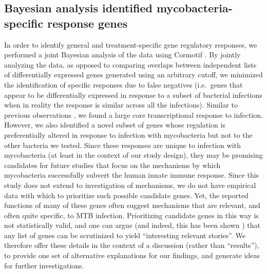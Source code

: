 \subsection{Bayesian analysis identified mycobacteria-specific
response
genes}\label{bayesian-analysis-identified-mycobacteria-specific-response-genes}

In order to identify general and treatment-specific gene regulatory
responses, we performed a joint Bayesian analysis of the data using
Cormotif \citep{Wei2015}. By jointly analyzing the data, as opposed to
comparing overlaps between independent lists of differentially
expressed genes generated using an arbitrary cutoff, we minimized the
identification of specific responses due to false negatives
(i.e.~genes that appear to be differentially expressed in response to
a subset of bacterial infections when in reality the response is
similar across all the infections). Similar to previous observations
\citep{Huang2001, Boldrick2002}, we found a large core transcriptional
response to infection. However, we also identified a novel subset of
genes whose regulation is preferentially altered in response to
infection with mycobacteria but not to the other bacteria we
tested. Since these responses are unique to infection with
mycobacteria (at least in the context of our study design), they may
be promising candidates for future studies that focus on the
mechanisms by which mycobacteria successfully subvert the human innate
immune response. Since this study does not extend to investigation of
mechanisms, we do not have empirical data with which to prioritize
such possible candidate genes. Yet, the reported functions of many of
these genes often suggest mechanisms that are relevant, and often
quite specific, to MTB infection. Prioritizing candidate genes in this
way is not statistically valid, and one can argue (and indeed, this
has been shown \citep{Pavlidis2012}) that any list of genes can be
scrutinized to yield ``interesting relevant stories''. We therefore
offer these details in the context of a discussion (rather than
``results''), to provide one set of alternative explanations for our
findings, and generate ideas for further investigations.

